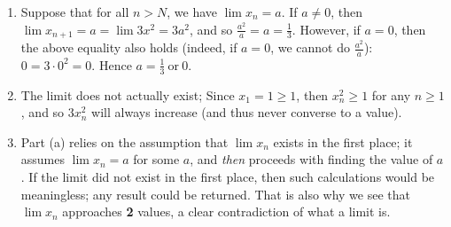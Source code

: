 \documentclass{homework}
\begin{document}
\begin{solution}
  \begin{enumerate}[label=(\alph*)]
    \item Suppose that for all $n>N$, we have $\lim{x_n}=a$. If $a\neq 0$, then
      $\lim{x_{n+1}}=a=\lim{3x^2}=3a^2$, and so $\frac{a^2}{a}=a=\frac{1}{3}$. However, if $a=0$,
      then the above equality also holds (indeed, if $a=0$, we cannot do $\frac{a^2}{a}$): $0=3\cdot
      0^2=0$. Hence $a=\frac{1}{3}~\text{or}~0$.
    \item The limit does not actually exist; Since $x_1=1\ge 1$, then $x_n^2\ge 1$ for any $n\ge 1$,
      and so $3x_n^2$ will always increase (and thus never converse to a value).
    \item Part (a) relies on the assumption that $\lim{x_n}$ exists in the first place; it assumes
      $\lim{x_n}=a$ for some $a$, and \textit{then} proceeds with finding the value of $a$. If the
      limit did not exist in the first place, then such calculations would be meaningless; any
      result could be returned. That is also why we see that $\lim{x_n}$ approaches \textbf{2}
      values, a clear contradiction of what a limit is.
  \end{enumerate}
\end{solution}
\end{document}

